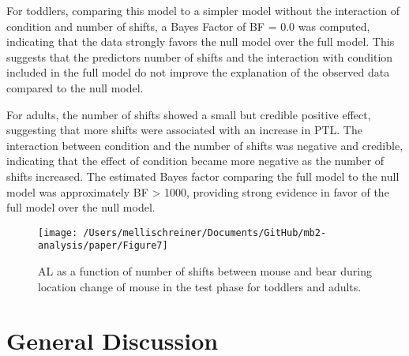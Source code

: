 \documentclass[
  man,floatsintext]{apa6}
\begin{document}
For toddlers, comparing this model to a simpler model without the interaction of condition and number of shifts, a Bayes Factor of BF = 0.0 was computed, indicating that the data strongly favors the null model over the full model. This suggests that the predictors number of shifts and the interaction with condition included in the full model do not improve the explanation of the observed data compared to the null model.

For adults, the number of shifts showed a small but credible positive effect, suggesting that more shifts were associated with an increase in PTL. The interaction between condition and the number of shifts was negative and credible, indicating that the effect of condition became more negative as the number of shifts increased. The estimated Bayes factor comparing the full model to the null model was approximately BF \textgreater{} 1000, providing strong evidence in favor of the full model over the null model.

\begin{figure}

{\centering \texttt{[image: /Users/mellischreiner/Documents/GitHub/mb2-analysis/paper/Figure7]} 

}

\caption{AL as a function of number of shifts between mouse and bear during location change of mouse in the test phase for toddlers and adults.}\label{fig:fig9}
\end{figure}

\section{General Discussion}\label{general-discussion}
\end{document}
